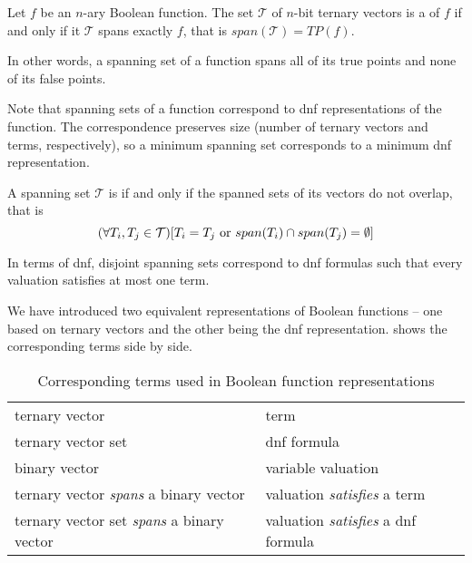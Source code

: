 \begin{definition}
Let $f$ be an $n$-ary Boolean function.
The set $\mathcal{T}$ of $n$-bit ternary vectors
is a  of $f$
if and only if
it $\mathcal{T}$ spans exactly $f$,
that is
$span(\mathcal{T}) = TP(f)$.
\end{definition}

In other words,
a spanning set of a function
spans all of its true points
and none of its false points.

Note that spanning sets of a function
correspond to \acrshort{dnf} representations
of the function.
The correspondence preserves size
(number of ternary vectors and terms, respectively),
so a minimum spanning set
corresponds to a minimum \acrshort{dnf} representation.

\begin{definition}
A spanning set $\mathcal{T}$ is 
if and only if the spanned sets of its vectors
do not overlap,
that is
\[
(\forall T_i, T_j \in \mathcal{T}) [T_i = T_j \text{ or }
span(T_i) \cap span(T_j) = \emptyset]
\]
\end{definition}

In terms of \acrshort{dnf},
disjoint spanning sets
correspond to \acrshort{dnf} formulas
such that every valuation satisfies at most one term.

We have introduced two equivalent representations
of Boolean functions --
one based on ternary vectors
and the other being the \acrshort{dnf} representation.
shows the corresponding terms side by side.

\begin{table}[h]
\centering
\begin{tabular}{ll}
ternary vector & term \\
ternary vector set & \acrshort{dnf} formula \\
binary vector & variable valuation \\
ternary vector \emph{spans} a binary vector &
valuation \emph{satisfies} a term \\
ternary vector set \emph{spans} a binary vector &
valuation \emph{satisfies} a \acrshort{dnf} formula
\end{tabular}
\caption{
Corresponding terms used
in Boolean function representations
}
\label{table:representations}
\end{table}

